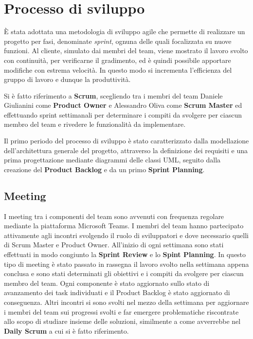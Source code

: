 \chapter{Processo di sviluppo}
È stata adottata una metodologia di sviluppo agile che permette di realizzare un progetto per fasi, denominate \textit{sprint}, ognuna delle quali focalizzata su nuove funzioni. Al cliente, simulato dai membri del team, viene mostrato il lavoro svolto con continuità, per verificarne il gradimento, ed è quindi possibile apportare modifiche con estrema velocità. In questo modo si incrementa l’efficienza del gruppo di lavoro e dunque la produttività.

Si è fatto riferimento a \textbf{Scrum}, scegliendo tra i membri del team Daniele Giulianini come \textbf{Product Owner} e Alessandro Oliva come \textbf{Scrum Master} ed effettuando sprint settimanali per determinare i compiti da svolgere per ciascun membro del team e rivedere le funzionalità da implementare.

Il primo periodo del processo di sviluppo è stato caratterizzato dalla modellazione dell'architettura generale del progetto, attraverso la definizione dei requisiti e una prima progettazione mediante diagrammi delle classi UML, seguito dalla creazione del \textbf{Product Backlog} e da un primo \textbf{Sprint Planning}.

\section{Meeting}
I meeting tra i componenti del team sono avvenuti con frequenza regolare mediante la piattaforma Microsoft Teams. 
I membri del team hanno partecipato attivamente agli incontri svolgendo il ruolo di sviluppatori e dove necessario quelli di Scrum Master e Product Owner.
All'inizio di ogni settimana sono stati effettuati in modo congiunto la \textbf{Sprint Review} e lo \textbf{Spint Planning}. In questo tipo di meeting è stato passato in rassegna il lavoro svolto nella settimana appena conclusa e sono stati determinati gli obiettivi e i compiti da svolgere per ciascun membro del team. Ogni componente è stato aggiornato sullo stato di avanzamento dei task individuati e il Product Backlog è stato aggiornato di conseguenza. Altri incontri si sono svolti nel mezzo della settimana per aggiornare i membri del team sui progressi svolti e far emergere problematiche riscontrate allo scopo di studiare insieme delle soluzioni, similmente a come avverrebbe nel \textbf{Daily Scrum} a cui si è fatto riferimento.


